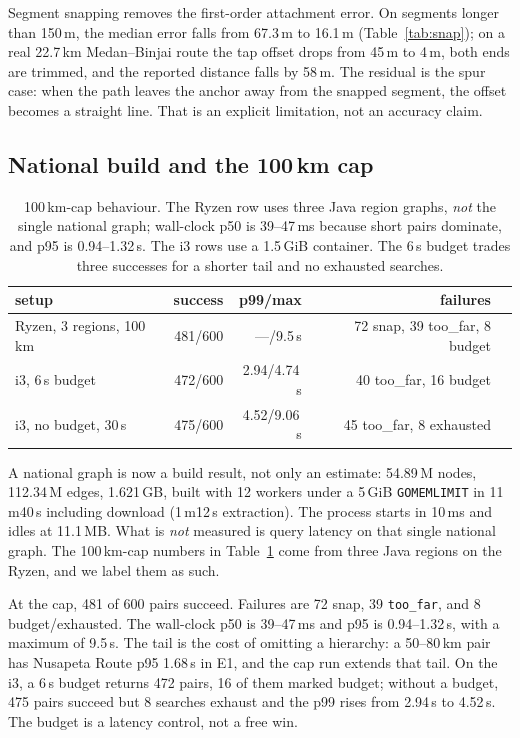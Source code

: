 \documentclass[sigconf,nonacm]{acmart}
\begin{document}
Segment snapping removes the first-order attachment error. On segments longer
than 150\,m, the median error falls from 67.3\,m to 16.1\,m
(Table~\ref{tab:snap}); on a real 22.7\,km Medan--Binjai route the tap offset drops
from 45\,m to 4\,m, both ends are trimmed, and the reported distance falls by
58\,m. The residual is the spur case: when the path leaves the anchor away from
the snapped segment, the offset becomes a straight line. That is an explicit
limitation, not an accuracy claim.

\subsection{National build and the 100\,km cap}
\begin{table}[t]
\footnotesize
\begin{tabular}{@{}lrrrr@{}}
\toprule
setup & success & p99/max & failures \\
\midrule
Ryzen, 3 regions, 100\,km & 481/600 & ---/9.5\,s & 72 snap, 39 too\_far, 8 budget \\
i3, 6\,s budget & 472/600 & 2.94/4.74\,s & 40 too\_far, 16 budget \\
i3, no budget, 30\,s & 475/600 & 4.52/9.06\,s & 45 too\_far, 8 exhausted \\
\bottomrule
\end{tabular}
\caption{100\,km-cap behaviour. The Ryzen row uses three Java region graphs,
\emph{not} the single national graph; wall-clock p50 is 39--47\,ms because short
pairs dominate, and p95 is 0.94--1.32\,s. The i3 rows use a 1.5\,GiB container.
The 6\,s budget trades three successes for a shorter tail and no exhausted
searches.}
\label{tab:cap}
\end{table}

A national graph is now a build result, not only an estimate: 54.89\,M nodes,
112.34\,M edges, 1.621\,GB, built with 12 workers under a 5\,GiB
\texttt{GOMEMLIMIT} in 11\,m40\,s including download (1\,m12\,s extraction). The
process starts in 10\,ms and idles at 11.1\,MB. What is \emph{not} measured is
query latency on that single national graph. The 100\,km-cap numbers in
Table~\ref{tab:cap} come from three Java regions on the Ryzen, and we label them
as such.

At the cap, 481 of 600 pairs succeed. Failures are 72 snap, 39 \texttt{too\_far},
and 8 budget/exhausted. The wall-clock p50 is 39--47\,ms and p95 is
0.94--1.32\,s, with a maximum of 9.5\,s. The tail is the cost of omitting a
hierarchy: a 50--80\,km pair has Nusapeta Route p95 1.68\,s in E1, and the cap run
extends that tail. On the i3, a 6\,s budget returns 472 pairs, 16 of them marked
budget; without a budget, 475 pairs succeed but 8 searches exhaust and the p99
rises from 2.94\,s to 4.52\,s. The budget is a latency control, not a free win.
\end{document}
